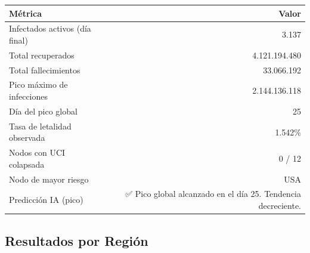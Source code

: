 \documentclass[12pt,a4paper]{article}
\begin{document}
\begin{center}
\begin{tabular}{lr}
\toprule
\textbf{Métrica} & \textbf{Valor} \\
\midrule
Infectados activos (día final)   & 3.137 \\
Total recuperados                & 4.121.194.480 \\
Total fallecimientos             & 33.066.192 \\
Pico máximo de infecciones       & 2.144.136.118 \\
Día del pico global              & 25 \\
Tasa de letalidad observada      & 1.542\% \\
Nodos con UCI colapsada          & 0 / 12 \\
Nodo de mayor riesgo             & USA \\
Predicción IA (pico)             & ✅ Pico global alcanzado en el día 25. Tendencia decreciente. \\
\bottomrule
\end{tabular}
\end{center}

\subsection{Resultados por Región}
\end{document}
